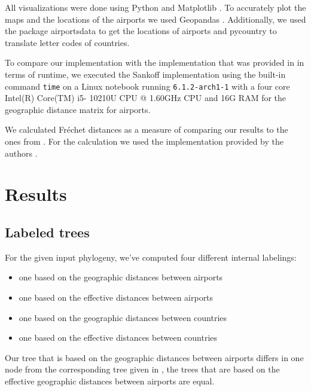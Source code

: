 \documentclass{article}
\begin{document}
All visualizations were done using Python and Matplotlib \cite{MatplotlibVisualizationPython}. To accurately plot the maps and the locations of the
airports we used Geopandas \cite{GeoPandas12GeoPandas}. Additionally, we used the package airportsdata \cite{borsettiAirportsdataExtensiveDatabase2022} to get the locations of
airports and pycountry \cite{theunePycountryISOCountry} to translate letter codes
of countries.

To compare our implementation with the implementation that
was provided in \cite{reimeringPhylogeographicReconstructionUsing2020} in terms of runtime, we
executed the Sankoff implementation using the built-in command \texttt{time} on
a Linux notebook running \texttt{6.1.2-arch1-1} with a four core Intel(R) Core(TM) i5-
10210U CPU @ 1.60GHz CPU and 16G RAM for the geographic distance matrix for airports.

We calculated Fr\'{e}chet distances as a measure of comparing our results to the ones from \cite{reimeringPhylogeographicReconstructionUsing2020}. For the calculation we used the implementation provided by the authors \cite{reimeringFrechetTreeDistance2018}.

\section{Results}

\subsection{Labeled trees}
For the given input phylogeny, we've computed four different internal labelings: 
\begin{itemize}
    \item one based on the geographic distances between airports
    \item one based on the effective distances between airports
    \item one based on the geographic distances between countries
    \item one based on the effective distances between countries
\end{itemize}

Our tree that is based on the geographic distances between airports differs in
one node from the corresponding tree given in
\cite{reimeringPhylogeographicReconstructionUsing2020}, the trees that are based
on the effective geographic distances between airports are equal.
\end{document}
